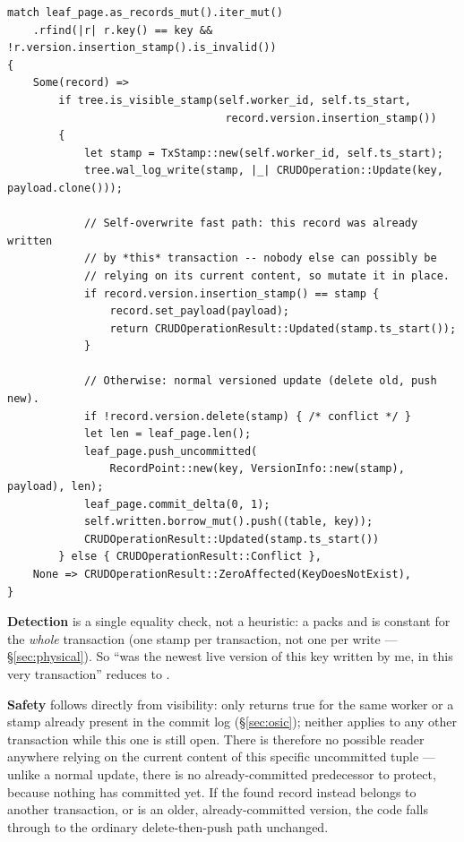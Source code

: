 \documentclass[11pt]{article}
\begin{document}
\begin{lstlisting}
match leaf_page.as_records_mut().iter_mut()
    .rfind(|r| r.key() == key && !r.version.insertion_stamp().is_invalid())
{
    Some(record) =>
        if tree.is_visible_stamp(self.worker_id, self.ts_start,
                                  record.version.insertion_stamp())
        {
            let stamp = TxStamp::new(self.worker_id, self.ts_start);
            tree.wal_log_write(stamp, |_| CRUDOperation::Update(key, payload.clone()));

            // Self-overwrite fast path: this record was already written
            // by *this* transaction -- nobody else can possibly be
            // relying on its current content, so mutate it in place.
            if record.version.insertion_stamp() == stamp {
                record.set_payload(payload);
                return CRUDOperationResult::Updated(stamp.ts_start());
            }

            // Otherwise: normal versioned update (delete old, push new).
            if !record.version.delete(stamp) { /* conflict */ }
            let len = leaf_page.len();
            leaf_page.push_uncommitted(
                RecordPoint::new(key, VersionInfo::new(stamp), payload), len);
            leaf_page.commit_delta(0, 1);
            self.written.borrow_mut().push((table, key));
            CRUDOperationResult::Updated(stamp.ts_start())
        } else { CRUDOperationResult::Conflict },
    None => CRUDOperationResult::ZeroAffected(KeyDoesNotExist),
}
\end{lstlisting}

\textbf{Detection} is a single equality check, not a heuristic: a  packs
 and is constant for the \emph{whole} transaction (one
stamp per transaction, not one per write --- \S\ref{sec:physical}). So ``was the newest
live version of this key written by me, in this very transaction'' reduces to
.

\textbf{Safety} follows directly from visibility:  only returns
true for the same worker or a stamp already present in the commit log
(\S\ref{sec:osic}); neither applies to any other transaction while this one is still
open. There is therefore no possible reader anywhere relying on the current content of
this specific uncommitted tuple --- unlike a normal update, there is no
already-committed predecessor to protect, because nothing has committed yet. If the
found record instead belongs to another transaction, or is an older, already-committed
version, the code falls through to the ordinary delete-then-push path unchanged.
\end{document}
